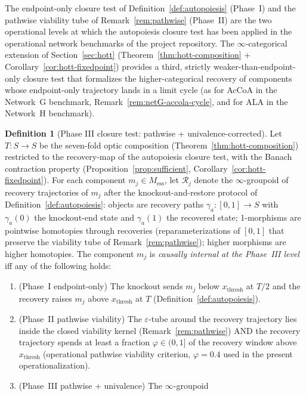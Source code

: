 \documentclass[11pt,a4paper]{article}
\theoremstyle{plain}
\theoremstyle{definition}
\newtheorem{definition}[theorem]{Definition}
\theoremstyle{remark}
\begin{document}
The endpoint-only closure test of Definition~\ref{def:autopoiesis} (Phase~I)
and the pathwise viability tube of Remark~\ref{rem:pathwise} (Phase~II) are
the two operational levels at which the autopoiesis closure test has been
applied in the operational network benchmarks of the project repository.
The $\infty$-categorical extension of Section~\ref{sec:hott} (Theorem~\ref{thm:hott-composition}
+ Corollary~\ref{cor:hott-fixedpoint}) provides a third, strictly
weaker-than-endpoint-only closure test that formalizes the higher-categorical
recovery of components whose endpoint-only trajectory lands in a limit
cycle (as for AcCoA in the Network~G benchmark, Remark~\ref{rem:netG-accola-cycle}, and
for ALA in the Network~H benchmark).

\begin{definition}[Phase III closure test: pathwise + univalence-corrected]
\label{def:autopoiesis-phase3}
Let $T : S \to S$ be the seven-fold optic composition
(Theorem~\ref{thm:hott-composition}) restricted to the recovery-map
of the autopoiesis closure test, with the Banach contraction property
(Proposition~\ref{prop:sufficient}, Corollary~\ref{cor:hott-fixedpoint}).
For each component $m_j \in M_{\mathrm{ess}}$, let
$\mathcal{R}_j$ denote the $\infty$-groupoid of recovery trajectories of
$m_j$ after the knockout-and-restore protocol of
Definition~\ref{def:autopoiesis}: objects are recovery paths
$\gamma_a : [0,1] \to S$ with $\gamma_a(0)$ the knockout-end state and
$\gamma_a(1)$ the recovered state; 1-morphisms are pointwise homotopies
through recoveries (reparameterizations of $[0,1]$ that preserve the
viability tube of Remark~\ref{rem:pathwise}); higher morphisms are higher
homotopies. The component $m_j$ is \emph{causally internal at the
Phase~III level} iff any of the following holds:
\begin{enumerate}[leftmargin=*, itemsep=2pt]
\item (Phase~I endpoint-only) The knockout sends $m_j$ below
  $x_{\mathrm{thresh}}$ at $T/2$ and the recovery raises $m_j$ above
  $x_{\mathrm{thresh}}$ at $T$ (Definition~\ref{def:autopoiesis}).
\item (Phase~II pathwise viability) The $\varepsilon$-tube around the
  recovery trajectory lies inside the closed viability kernel
  (Remark~\ref{rem:pathwise}) AND the recovery trajectory spends at
  least a fraction $\varphi \in (0,1]$ of the recovery window above
  $x_{\mathrm{thresh}}$ (operational pathwise viability criterion,
  $\varphi = 0.4$ used in the present operationalization).
\item (Phase~III pathwise + univalence) The $\infty$-groupoid

\end{enumerate}
\end{definition}
\end{document}
